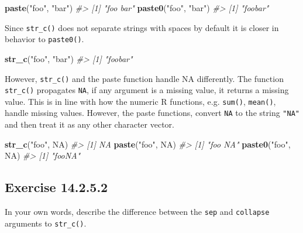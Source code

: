 \documentclass[]{book}
\newenvironment{Shaded}{\begin{snugshade}}{\end{snugshade}}
\newcommand{\CommentTok}[1]{\textcolor[rgb]{0.56,0.35,0.01}{\textit{#1}}}
\newcommand{\KeywordTok}[1]{\textcolor[rgb]{0.13,0.29,0.53}{\textbf{#1}}}
\newcommand{\NormalTok}[1]{#1}
\newcommand{\OtherTok}[1]{\textcolor[rgb]{0.56,0.35,0.01}{#1}}
\newcommand{\StringTok}[1]{\textcolor[rgb]{0.31,0.60,0.02}{#1}}
\theoremstyle{plain}
\theoremstyle{remark}
\begin{document}
\begin{Shaded}
\begin{Highlighting}[]
\KeywordTok{paste}\NormalTok{(}\StringTok{"foo"}\NormalTok{, }\StringTok{"bar"}\NormalTok{)}
\CommentTok{#> [1] "foo bar"}
\KeywordTok{paste0}\NormalTok{(}\StringTok{"foo"}\NormalTok{, }\StringTok{"bar"}\NormalTok{)}
\CommentTok{#> [1] "foobar"}
\end{Highlighting}
\end{Shaded}

Since \texttt{str\_c()} does not separate strings with spaces by default
it is closer in behavior to \texttt{paste0()}.

\begin{Shaded}
\begin{Highlighting}[]
\KeywordTok{str_c}\NormalTok{(}\StringTok{"foo"}\NormalTok{, }\StringTok{"bar"}\NormalTok{)}
\CommentTok{#> [1] "foobar"}
\end{Highlighting}
\end{Shaded}

However, \texttt{str\_c()} and the paste function handle NA differently.
The function \texttt{str\_c()} propagates \texttt{NA}, if any argument
is a missing value, it returns a missing value. This is in line with how
the numeric R functions, e.g. \texttt{sum()}, \texttt{mean()}, handle
missing values. However, the paste functions, convert \texttt{NA} to the
string \texttt{"NA"} and then treat it as any other character vector.

\begin{Shaded}
\begin{Highlighting}[]
\KeywordTok{str_c}\NormalTok{(}\StringTok{"foo"}\NormalTok{, }\OtherTok{NA}\NormalTok{)}
\CommentTok{#> [1] NA}
\KeywordTok{paste}\NormalTok{(}\StringTok{"foo"}\NormalTok{, }\OtherTok{NA}\NormalTok{)}
\CommentTok{#> [1] "foo NA"}
\KeywordTok{paste0}\NormalTok{(}\StringTok{"foo"}\NormalTok{, }\OtherTok{NA}\NormalTok{)}
\CommentTok{#> [1] "fooNA"}
\end{Highlighting}
\end{Shaded}

\hypertarget{exercise-14.2.5.2}{%
\subsection*{\texorpdfstring{Exercise
{14.2.5.2}}{Exercise 14.2.5.2}}\label{exercise-14.2.5.2}}

In your own words, describe the difference between the \texttt{sep} and
\texttt{collapse} arguments to \texttt{str\_c()}.
\end{document}
